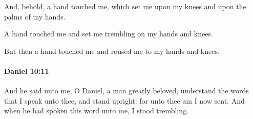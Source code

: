 			\begin{versebox}
					\item[BHS] 
					\item[LXX] 
					\item[ASV] And, behold, a hand touched me, which set me upon my knees and upon the palms of my hands.
					\item[NIV] A hand touched me and set me trembling on my hands and knees.
					\item[NRSV] But then a hand touched me and roused me to my hands and knees.
			\end{versebox}

		\paragraph{Daniel 10:11} %
			\label{DANIEL-10-11}

			And he said unto me, O Daniel, a man greatly beloved, understand the words that I speak unto thee, and stand upright: for unto thee am I now sent. And when he had spoken this word unto me, I stood trembling.

